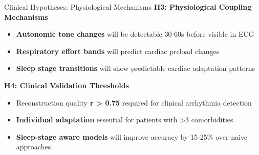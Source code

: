 \documentclass[aspectratio=169,11pt]{beamer}
\begin{document}
\begin{frame}{Clinical Hypotheses: Physiological Mechanisms}
  \textbf{\textcolor{tcairemred}{\large H3: Physiological Coupling Mechanisms}}
  
  \vspace{0.5em}
      \begin{itemize}
    \large
    \item \textbf{Autonomic tone changes} will be detectable 30-60s before visible in ECG
    
    \vspace{0.5em}
    \item \textbf{Respiratory effort bands} will predict cardiac preload changes
    
    \vspace{0.5em}
    \item \textbf{Sleep stage transitions} will show predictable cardiac adaptation patterns
      \end{itemize}
      
  \vspace{1em}
  \textbf{\textcolor{tcairemblue}{\large H4: Clinical Validation Thresholds}}
  
  \vspace{0.5em}
      \begin{itemize}
    \large
    \item Reconstruction quality \textbf{r > 0.75} required for clinical arrhythmia detection
    
    \vspace{0.5em}
    \item \textbf{Individual adaptation} essential for patients with >3 comorbidities
    
    \vspace{0.5em}
    \item \textbf{Sleep-stage aware models} will improve accuracy by 15-25\% over naive approaches
      \end{itemize}
\end{frame}
\end{document}
